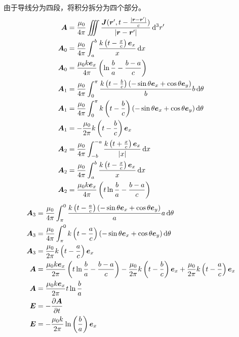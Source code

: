 由于导线分为四段，将积分拆分为四个部分。
\begin{align*}
    \boldsymbol{A}&=\frac{\mu_0}{4\pi}\iiint\frac{\boldsymbol{J}(\boldsymbol{r}', t-\frac{\vert{}\boldsymbol{r} - \boldsymbol{r}'\vert{}}{c})}{\vert{}\boldsymbol{r} - \boldsymbol{r}'\vert{}}\dif ^3r'\\
    \boldsymbol{A}_0&=\frac{\mu_0}{4\pi}\int_{a}^{b}\frac{k\left(t-\frac{x}{c}\right)\boldsymbol{e}_x}{x}\dif x\\
    \boldsymbol{A}_0&=\frac{\mu_0k\boldsymbol{e}_x}{4\pi}\left(\ln\frac{b}{a}-\frac{b-a}{c}\right)\\
    \boldsymbol{A}_1&=\frac{\mu_0}{4\pi}\int_{0}^{\pi}\frac{k\left(t-\frac{b}{c}\right)\left(-\sin\theta\boldsymbol{e}_x+\cos\theta\boldsymbol{e}_y\right)}{b}b\dif \theta\\
    \boldsymbol{A}_1&=\frac{\mu_0}{4\pi}\int_{0}^{\pi}k\left(t-\frac{b}{c}\right)\left(-\sin\theta\boldsymbol{e}_x+\cos\theta\boldsymbol{e}_y\right)\dif \theta\\
    \boldsymbol{A}_1&=-\frac{\mu_0}{2\pi}k\left(t-\frac{b}{c}\right)\boldsymbol{e}_x\\
\boldsymbol{A}_2&=\frac{\mu_0}{4\pi}\int_{-b}^{-a}\frac{k\left(t+\frac{x}{c}\right)\boldsymbol{e}_x}{|x|}\dif x\\
    \boldsymbol{A}_2&=\frac{\mu_0}{4\pi}\int_{a}^{b}\frac{k\left(t-\frac{x}{c}\right)\boldsymbol{e}_x}{x}\dif x\\
    \boldsymbol{A}_2&=\frac{\mu_0k\boldsymbol{e}_x}{4\pi}\left(t\ln\frac{b}{a}-\frac{b-a}{c}\right)
    \end{align*}
    \begin{align*}
    \boldsymbol{A}_3&=\frac{\mu_0}{4\pi}\int_{\pi}^{0}\frac{k\left(t-\frac{a}{c}\right)\left(-\sin\theta\boldsymbol{e}_x+\cos\theta\boldsymbol{e}_y\right)}{a}a\dif \theta\\
    \boldsymbol{A}_3&=\frac{\mu_0}{4\pi}\int_{\pi}^{0}k\left(t-\frac{a}{c}\right)\left(-\sin\theta\boldsymbol{e}_x+\cos\theta\boldsymbol{e}_y\right)\dif \theta\\
    \boldsymbol{A}_3&=\frac{\mu_0}{2\pi}k\left(t-\frac{a}{c}\right)\boldsymbol{e}_x\\
    \boldsymbol{A}&=\frac{\mu_0k\boldsymbol{e}_x}{2\pi}\left(t\ln\frac{b}{a}-\frac{b-a}{c}\right)
    -\frac{\mu_0}{2\pi}k\left(t-\frac{b}{c}\right)\boldsymbol{e}_x
    +\frac{\mu_0}{2\pi}k\left(t-\frac{a}{c}\right)\boldsymbol{e}_x\\
    \boldsymbol{A}&=\frac{\mu_0k\boldsymbol{e}_x}{2\pi}t\ln\frac{b}{a}\\
    \boldsymbol{E} &= -\frac{\partial \boldsymbol{A}}{\partial t}\\
    \boldsymbol{E} &= -\frac{\mu_0 k}{2\pi} \ln\left(\frac{b}{a}\right) \boldsymbol{e}_x
\end{align*}
